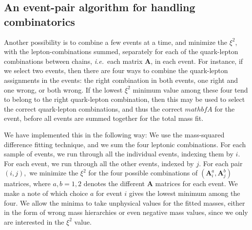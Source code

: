 \documentclass[twoside,english]{uiofysmaster}
\begin{document}
\subsection{An event-pair algorithm for handling combinatorics}
Another possibility is to combine a few events at a time, and minimize the $\xi^2$, with the lepton-combinations summed, separately for each of the quark-lepton combinations between chains, {\it i.e.}\ each matrix $\mathbf{A}$, in each event. For instance, if we select two events, then there are four ways to combine the quark-lepton assignments in the events: the right combination in both events, one right and one wrong, or both wrong. If the lowest $\xi^2$ minimum value among these four tend to belong to the right quark-lepton combination, then this may be used to select the correct quark-lepton combinations, and thus the correct $mathbf{A}$ for the event, before all events are summed together for the total mass fit. 

We have implemented this in the following way: We use the mass-squared difference fitting technique, and we sum the four leptonic combinations. For each sample of events, we run through all the individual events, indexing them by $i$. For each event, we run through all the other events, indexed by $j$. For each pair $(i,j)$,~we minimize the $\xi^2$ for the four possible combinations of $(\mathbf{A}_i^a, \mathbf{A}_j^b)$ matrices, where $a,b=1,2$ denotes the different $\mathbf{A}$ matrices for each event. We make a note of which choice $a$ for event $i$ gives the lowest minimum among the four. We allow the minima to take unphysical values for the fitted masses, either in the form of wrong mass hierarchies or even negative mass values, since we only are interested in the $\xi^2$ value. 
\end{document}
